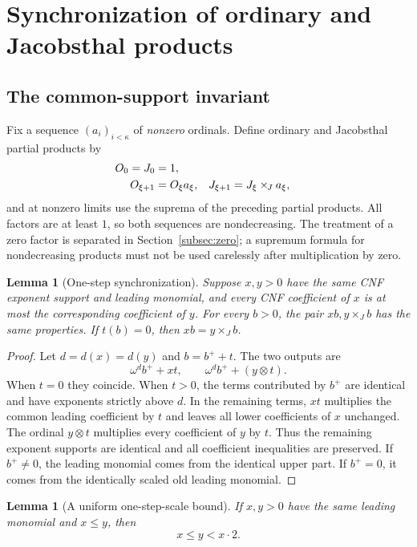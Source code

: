 \documentclass[11pt,letterpaper]{article}
\newtheorem{lemma}[theorem]{Lemma}
\theoremstyle{definition}
\theoremstyle{remark}
\newcommand{\J}{\mathbin{\times_{\!J}}}
\begin{document}
\section{Synchronization of ordinary and Jacobsthal products}\label{sec:sync}

\subsection{The common-support invariant}

Fix a sequence $(a_i)_{i<\kappa}$ of \emph{nonzero} ordinals. Define
ordinary and Jacobsthal partial products by
\begin{align}\label{eq:partial-products}
 O_0=J_0&=1,\notag\\
 O_{\xi+1}&=O_\xi a_\xi,&
 J_{\xi+1}&=J_\xi\J a_\xi,
\end{align}
and at nonzero limits use the suprema of the preceding partial products.
All factors are at least $1$, so both sequences are nondecreasing.
The treatment of a zero factor is separated in
Section~\ref{subsec:zero}; a supremum formula for nondecreasing products
must not be used carelessly after multiplication by zero.

\begin{lemma}[One-step synchronization]\label{lem:one-step}
Suppose $x,y>0$ have the same CNF exponent support and leading monomial,
and every CNF coefficient of $x$ is at most the corresponding coefficient
of $y$. For every $b>0$, the pair $xb,y\J b$ has the same properties.
If $t(b)=0$, then $xb=y\J b$.
\end{lemma}

\begin{proof}
Let $d=d(x)=d(y)$ and $b=b^++t$. The two outputs are
\[
 \omega^d b^++xt,
 \qquad
 \omega^d b^++(y\otimes t).
\]
When $t=0$ they coincide. When $t>0$, the terms contributed by $b^+$
are identical and have exponents strictly above $d$. In the remaining
terms, $xt$ multiplies the common leading coefficient by $t$ and leaves
all lower coefficients of $x$ unchanged. The ordinal $y\otimes t$
multiplies every coefficient of $y$ by $t$. Thus the remaining exponent
supports are identical and all coefficient inequalities are preserved.
If $b^+\neq0$, the leading monomial comes from the identical upper part.
If $b^+=0$, it comes from the identically scaled old leading monomial.
\end{proof}

\begin{lemma}[A uniform one-step-scale bound]\label{lem:factor-two}
If $x,y>0$ have the same leading monomial and $x\leq y$, then
\[
 x\leq y<x\cdot2.
\]
\end{lemma}
\end{document}
